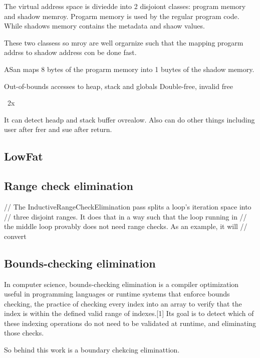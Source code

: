 The virtual address space is diviedde into 2 disjoiont classes:
program memory and shadow memroy.
Progarm memory is used by the regular program code.
While shadows memory contains the metadata and shaow values.

These two classess so mroy are well orgarnize such that the mapping progarm addrss
to shadow address con be done fast.

ASan maps 8 bytes of the progarm memory into 1 buytes of the shadow memory.

Out-of-bounds accesses to heap, stack and globals
Double-free, invalid free


~2x

It can detect headp and stack buffer ovrealow.
Also can do other things including user after frer and sue after return.



\subsection{LowFat}


\subsection{   Range check elimination}
// The InductiveRangeCheckElimination pass splits a loop's iteration space into
// three disjoint ranges.  It does that in a way such that the loop running in
// the middle loop provably does not need range checks. As an example, it will
// convert


\subsection{Bounds-checking elimination}
In computer science, bounds-checking elimination is a compiler optimization useful in programming languages or runtime systems that enforce bounds checking, the practice of checking every index into an array to verify that the index is within the defined valid range of indexes.[1] Its goal is to detect which of these indexing operations do not need to be validated at runtime, and eliminating those checks.

So behind this work is a boundary chekcing eliminattion.

